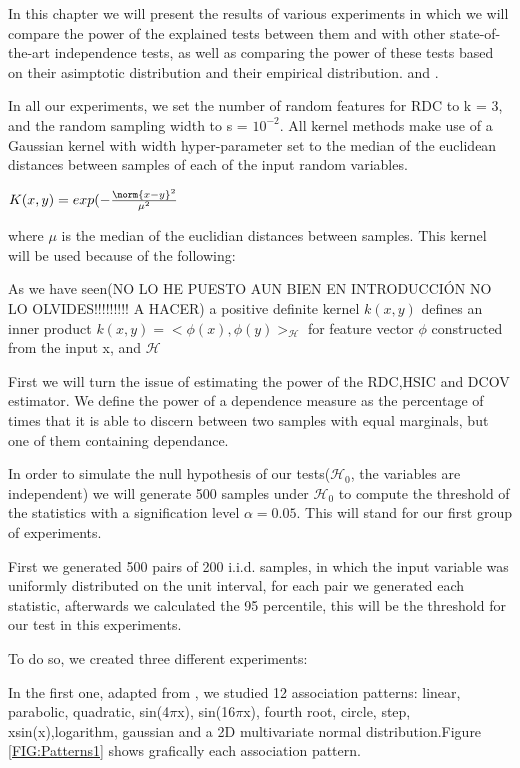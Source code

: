 In this chapter we will present the results of various experiments in which we will compare the power of the explained tests between them and with other state-of-the-art independence tests, as well as comparing the power of these tests based on their asimptotic distribution and their empirical distribution. and \cite{HSICdistribution}.

In all our experiments, we set the number of random features for RDC to k = 3, and the random sampling width to s = $10^{-2}$. All kernel methods make use of a Gaussian kernel with width hyper-parameter set to the median of the euclidean distances between samples of each of the input random variables.

$K(x,y) = exp(-\frac{\norm{x-y}^{2}}{\mu^{2}}$

where $\mu$ is the median of the euclidian distances between samples.
This kernel will be used because of the following:

As we have seen(NO LO HE PUESTO AUN BIEN EN INTRODUCCIÓN NO LO OLVIDES!!!!!!!!! A HACER) a positive definite kernel $k(x,y)$ defines an inner product $k(x,y) = <\phi(x),\phi(y)>_{\mathcal{H}}$ for feature vector $\phi$ constructed from the input x, and $\mathcal{H}$

First we will turn the issue of estimating the power of the RDC,HSIC and DCOV estimator. We define the power of a dependence measure as the percentage of times that it is able to discern between two samples with equal marginals, but one of them containing dependance.

In order to simulate the null hypothesis of our tests($\mathcal{H}_{0}$, the variables are independent) we will generate 500 samples under $\mathcal{H}_{0}$ to compute the threshold of the statistics with a signification level $\alpha = 0.05$. This will stand for our first group of experiments.

First we generated 500 pairs  of 200 i.i.d. samples, in which the input variable was uniformly distributed on the unit interval, for each pair we generated each statistic, afterwards we calculated the 95 percentile, this will be the threshold for our test in this experiments.

To do so, we created three different experiments:

In the first one, adapted from \cite{RDC1}, we studied 12 association patterns: linear, parabolic, quadratic, sin(4$\pi$x), sin(16$\pi$x), fourth root, circle, step, xsin(x),logarithm, gaussian and a 2D multivariate normal distribution.Figure \ref{FIG:Patterns1} shows grafically each association pattern.

